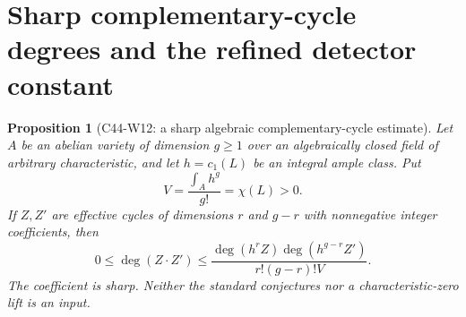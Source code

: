 \documentclass[11pt]{article}
\newtheorem{proposition}[theorem]{Proposition}
\theoremstyle{remark}\newtheorem{remark}[theorem]{Remark}
\begin{document}

\section{Sharp complementary-cycle degrees and the refined detector constant}

\begin{proposition}[C44-W12: a sharp algebraic complementary-cycle estimate]
Let $A$ be an abelian variety of dimension $g\geq1$ over an
algebraically closed field of arbitrary characteristic, and let
$h=c_1(L)$ be an integral ample class. Put
\[
                   V=\frac{\int_Ah^g}{g!}=\chi(L)>0.
\]
If $Z,Z'$ are effective cycles of dimensions $r$ and $g-r$ with
nonnegative integer coefficients, then
\[
 0\leq\deg(Z\cdot Z')
   \leq\frac{\deg(h^rZ)\deg(h^{g-r}Z')}{r!(g-r)!V}.
 \tag{C44.W12.1}
\]
The coefficient is sharp. Neither the standard conjectures nor a
characteristic-zero lift is an input.
\end{proposition}
\end{document}
